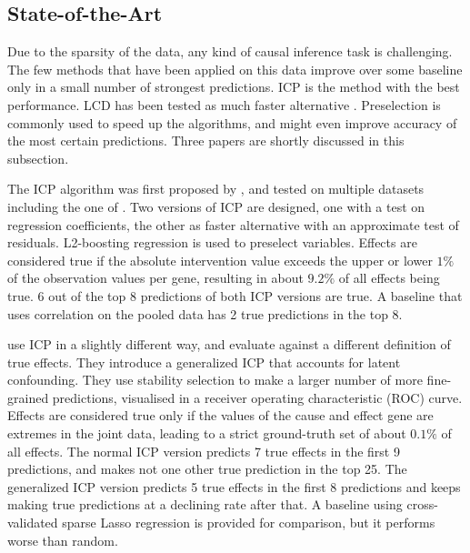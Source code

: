 \subsection{State-of-the-Art}

Due to the sparsity of the data, any kind of causal inference task is challenging. The few methods that have been applied on this data improve over some baseline only in a small number of strongest predictions. ICP is the method with the best performance. LCD has been tested as much faster alternative \citep{versteeg2019boosting}. Preselection is commonly used to speed up the algorithms, and might even improve accuracy of the most certain predictions. Three papers are shortly discussed in this subsection.

The ICP algorithm was first proposed by \textbf{\citet{peters2016causal}}, and tested on multiple datasets including the one of \citet{kemmeren2014large}. Two versions of ICP are designed, one with a test on regression coefficients, the other as faster alternative with an approximate test of residuals. L2-boosting regression \citep{schapire1998boosting} is used to preselect variables. Effects are considered true if the absolute intervention value exceeds the upper or lower $1\%$ of the observation values per gene, resulting in about $9.2\%$ of all effects being true. 6 out of the top 8 predictions of both ICP versions are true. A baseline that uses correlation on the pooled data has 2 true predictions in the top 8.

\textbf{\citet{meinshausen2016methods}} use ICP in a slightly different way, and evaluate against a different definition of true effects. They introduce a generalized ICP that accounts for latent confounding. They use stability selection \citep{meinshausen2010stability} to make a larger number of more fine-grained predictions, visualised in a receiver operating characteristic (ROC) curve. Effects are considered true only if the values of the cause and effect gene are extremes in the joint data, leading to a strict ground-truth set of about $0.1\%$ of all effects. The normal ICP version predicts 7 true effects in the first 9 predictions, and makes not one other true prediction in the top 25. The generalized ICP version predicts 5 true effects in the first 8 predictions and keeps making true predictions at a declining rate after that. A baseline using cross-validated sparse Lasso regression is provided for comparison, but it performs worse than random.

